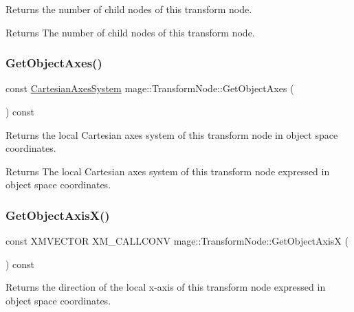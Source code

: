 Returns the number of child nodes of this transform node.

\begin{DoxyReturn}{Returns}
The number of child nodes of this transform node. 
\end{DoxyReturn}
\hypertarget{classmage_1_1_transform_node_a3e6b79b7e1a0844d8f93acaecdf65346}{}\label{classmage_1_1_transform_node_a3e6b79b7e1a0844d8f93acaecdf65346} 
\subsubsection{\texorpdfstring{Get\+Object\+Axes()}{GetObjectAxes()}}
{\footnotesize\ttfamily const \hyperlink{structmage_1_1_cartesian_axes_system}{Cartesian\+Axes\+System} mage\+::\+Transform\+Node\+::\+Get\+Object\+Axes (\begin{DoxyParamCaption}{ }\end{DoxyParamCaption}) const\hspace{0.3cm}{\ttfamily [noexcept]}}

Returns the local Cartesian axes system of this transform node in object space coordinates.

\begin{DoxyReturn}{Returns}
The local Cartesian axes system of this transform node expressed in object space coordinates. 
\end{DoxyReturn}
\hypertarget{classmage_1_1_transform_node_aea5ced596f54f74d0d5308f2a14dd7cc}{}\label{classmage_1_1_transform_node_aea5ced596f54f74d0d5308f2a14dd7cc} 
\subsubsection{\texorpdfstring{Get\+Object\+Axis\+X()}{GetObjectAxisX()}}
{\footnotesize\ttfamily const X\+M\+V\+E\+C\+T\+OR X\+M\+\_\+\+C\+A\+L\+L\+C\+O\+NV mage\+::\+Transform\+Node\+::\+Get\+Object\+AxisX (\begin{DoxyParamCaption}{ }\end{DoxyParamCaption}) const\hspace{0.3cm}{\ttfamily [noexcept]}}

Returns the direction of the local x-\/axis of this transform node expressed in object space coordinates.

